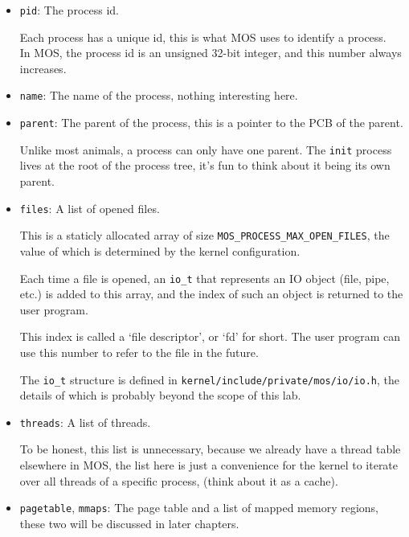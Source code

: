 \begin{itemize}
    \item \texttt{pid}: The process id.

          Each process has a unique id, this is what MOS uses to identify a process.\\
          In MOS, the process id is an unsigned 32-bit integer, and this number always
          increases.

    \item \texttt{name}: The name of the process, nothing interesting here.

    \item \texttt{parent}: The parent of the process, this is a pointer to the PCB of the parent.

          Unlike most animals, a process can only have one parent. The \texttt{init}
          process lives at the root of the process tree, it's fun to think about it being its own
          parent.

    \item \texttt{files}: A list of opened files.

          This is a staticly allocated array of size \texttt{MOS\_PROCESS\_MAX\_OPEN\_FILES},
          the value of which is determined by the kernel configuration.

          Each time a file is opened, an \texttt{io\_t} that represents an IO object (file, pipe, etc.)
          is added to this array, and the index of such an object is returned to the user program.

          This index is called a `file descriptor', or `fd' for short. The user program can use
          this number to refer to the file in the future.

          The \texttt{io\_t} structure is defined in \texttt{kernel/include/private/mos/io/io.h},
          the details of which is probably beyond the scope of this lab.

    \item \texttt{threads}: A list of threads.

          To be honest, this list is unnecessary, because we already have a thread table elsewhere
          in MOS, the list here is just a convenience for the kernel to iterate over all threads
          of a specific process, (think about it as a cache).

    \item \texttt{pagetable}, \texttt{mmaps}: The page table and a list of mapped memory regions,
          these two will be discussed in later chapters.
\end{itemize}

